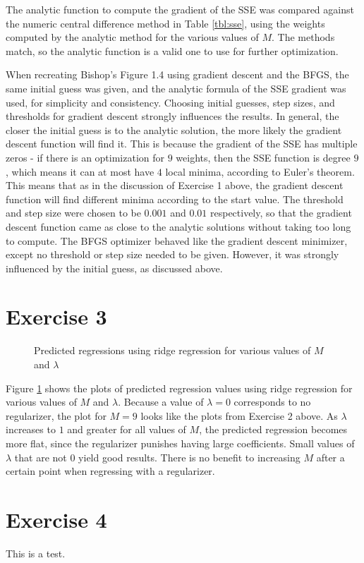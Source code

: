 \documentclass[10pt]{article}
\begin{document}
The analytic function to compute the gradient of the SSE was compared against the numeric central difference method in Table \ref{tbl:sse}, using the weights computed by the analytic method for the various values of $M$. The methods match, so the analytic function is a valid one to use for further optimization.

When recreating Bishop's Figure 1.4 using gradient descent and the \textsc{BFGS}, the same initial guess was given, and the analytic formula of the SSE gradient was used, for simplicity and consistency. Choosing initial guesses, step sizes, and thresholds for gradient descent strongly influences the results. In general, the closer the initial guess is to the analytic solution, the more likely the gradient descent function will find it. This is because the gradient of the SSE has multiple zeros - if there is an optimization for $9$ weights, then the SSE function is degree $9$, which means it can at most have $4$ local minima, according to Euler's theorem. This means that as in the discussion of Exercise 1 above, the gradient descent function will find different minima according to the start value. The threshold and step size were chosen to be $0.001$ and $0.01$ respectively, so that the gradient descent function came as close to the analytic solutions without taking too long to compute. The \textsc{BFGS} optimizer behaved like the gradient descent minimizer, except no threshold or step size needed to be given. However, it was strongly influenced by the initial guess, as discussed above.

\section{Exercise 3}

\begin{figure}[!ht]
	\centering
	\caption{Predicted regressions using ridge regression for various values of $M$ and $\lambda$}
	\label{fig:3-1}
\end{figure}

Figure \ref{fig:3-1} shows the plots of predicted regression values using ridge regression for various values of $M$ and $\lambda$. Because a value of $\lambda=0$ corresponds to no regularizer, the plot for $M=9$ looks like the plots from Exercise 2 above. As $\lambda$ increases to $1$ and greater for all values of $M$, the predicted regression becomes more flat, since the regularizer punishes having large coefficients. Small values of $\lambda$ that are not $0$ yield good results. There is no benefit to increasing $M$ after a certain point when regressing with a regularizer.



\section{Exercise 4}

This is a test. 
\end{document}
